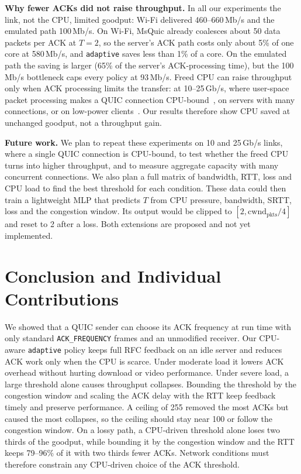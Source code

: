 \documentclass[11pt]{article}
\newcommand{\pol}[1]{\texttt{#1}}            %
\newcommand{\para}[1]{\textbf{#1}} %
\newcommand{\mbps}{\,Mb/s}
\begin{document}
\para{Why fewer ACKs did not raise throughput.} In all our experiments the link, not the CPU,
limited goodput: Wi-Fi delivered 460--660\mbps{} and the emulated path 100\mbps. On Wi-Fi, MsQuic
already coalesces about 50 data packets per ACK at $T{=}2$, so the server's ACK path costs only
about 5\% of one core at 580\mbps, and \pol{adaptive} saves less than 1\% of a core. On the
emulated path the saving is larger (65\% of the server's ACK-processing time), but the 100\mbps{}
bottleneck caps every policy at 93\mbps. Freed CPU can raise throughput only when ACK processing
limits the transfer: at 10--25\,Gb/s, where user-space packet processing makes a QUIC connection
CPU-bound~\cite{zhang2024quic}, on servers with many connections, or on low-power
clients~\cite{bi2024litequic}. Our results therefore show CPU saved at unchanged goodput, not a
throughput gain.

\para{Future work.} We plan to repeat these experiments on 10 and 25\,Gb/s links, where a single
QUIC connection is CPU-bound, to test whether the freed CPU turns into higher throughput, and to
measure aggregate capacity with many concurrent connections. We also plan a full matrix of
bandwidth, RTT, loss and CPU load to find the best threshold for each condition. These data could then train a lightweight MLP that predicts $T$ from CPU
pressure, bandwidth, SRTT, loss and the congestion window. Its output would be clipped to
$[2, \mathrm{cwnd}_{\mathrm{pkts}}/4]$ and reset to 2 after a loss. Both extensions are proposed
and not yet implemented.

\section{Conclusion and Individual Contributions}
We showed that a QUIC sender can choose its ACK frequency at run time with only standard
\pol{ACK\_FREQUENCY} frames and an unmodified receiver. Our CPU-aware \pol{adaptive} policy keeps
full RFC feedback on an idle server and reduces ACK work only when the CPU is scarce. Under moderate
load it lowers ACK overhead without hurting download or video performance. Under severe load, a
large threshold alone causes throughput collapses. Bounding the threshold by the congestion window
and scaling the ACK delay with the RTT keep feedback timely and preserve performance. A ceiling of
255 removed the most ACKs but caused the most collapses, so the ceiling should stay near 100 or
follow the congestion window. On a
lossy path, a CPU-driven threshold alone loses two thirds of the goodput, while bounding it by the
congestion window and the RTT keeps 79--96\% of it with two thirds fewer ACKs. Network conditions
must therefore constrain any CPU-driven choice of the ACK threshold.
\end{document}
